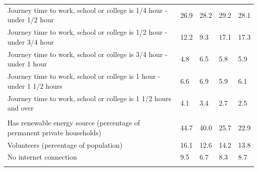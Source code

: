 \documentclass{article}
\begin{document}
\begin{table}[h]
\begin{tabular}{KTTTT}
Journey time to work, school or college is 1/4 hour - under 1/2 hour & 26.9& 28.2& 29.2& 28.1\\
Journey time to work, school or college is 1/2 hour - under 3/4 hour & 12.2&  9.3& 17.1& 17.3\\
Journey time to work, school or college is 3/4 hour - under 1 hour & 4.8& 6.5& 5.8& 5.9\\
Journey time to work, school or college is 1 hour - under 1 1/2 hours & 6.6& 6.9& 5.9& 6.1\\
Journey time to work, school or college is 1 1/2 hours and over & 4.1& 3.4& 2.7& 2.5\\
\hline
    \\ 
    \hline
Has renewable energy source (percentage of permanent private households) & 44.7& 40.0& 25.7& 22.9\\
    \hline
Volunteers (percentage of population) & 16.1& 12.6& 14.2& 13.8\\
    \hline
No internet connection& 9.5& 6.7& 8.3& 8.7\\
\hline
\end{tabular}
\end{table}
\end{document}
